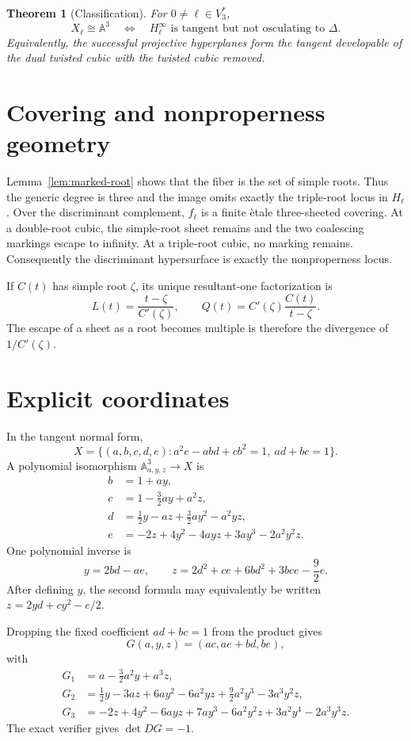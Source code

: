 \documentclass[11pt]{article}
\newcommand{\A}{\mathbb A}
\newtheorem{theorem}{Theorem}[section]
\theoremstyle{remark}
\begin{document}
\begin{theorem}[Classification]\label{thm:classification}
For $0\ne\ell\in V_3^*$,
\[
X_\ell\cong\A^3
\quad\Longleftrightarrow\quad
H_\ell^\infty\text{ is tangent but not osculating to }\Delta.
\]
Equivalently, the successful projective hyperplanes form the tangent
developable of the dual twisted cubic with the twisted cubic removed.
\end{theorem}

\section{Covering and nonproperness geometry}

Lemma~\ref{lem:marked-root} shows that the fiber is the set of simple roots.
Thus the generic degree is three and the image omits exactly the triple-root
locus in $H_\ell$. Over the discriminant complement, $f_\ell$ is a finite
\`etale three-sheeted covering. At a double-root cubic, the simple-root sheet
remains and the two coalescing markings escape to infinity. At a triple-root
cubic, no marking remains. Consequently the discriminant hypersurface is
exactly the nonproperness locus.

If $C(t)$ has simple root $\zeta$, its unique resultant-one factorization is
\[
L(t)=\frac{t-\zeta}{C'(\zeta)},
\qquad
Q(t)=C'(\zeta)\frac{C(t)}{t-\zeta}.
\]
The escape of a sheet as a root becomes multiple is therefore the divergence
of $1/C'(\zeta)$.

\section{Explicit coordinates}

In the tangent normal form,
\[
X=\{(a,b,c,d,e):a^2e-abd+cb^2=1,\ ad+bc=1\}.
\]
A polynomial isomorphism $\A^3_{a,y,z}\to X$ is
\[
\begin{aligned}
b&=1+ay,\\
c&=1-\frac32ay+a^2z,\\
d&=\frac12y-az+\frac32ay^2-a^2yz,\\
e&=-2z+4y^2-4ayz+3ay^3-2a^2y^2z.
\end{aligned}
\]
One polynomial inverse is
\[
y=2bd-ae,
\qquad
z=2d^2+ce+6bd^2+3bce-\frac92e.
\]
After defining $y$, the second formula may equivalently be written
$z=2yd+cy^2-e/2$.

Dropping the fixed coefficient $ad+bc=1$ from the product gives
\[
G(a,y,z)=(ac,ae+bd,be),
\]
with
\[
\begin{aligned}
G_1&=a-\frac32a^2y+a^3z,\\
G_2&=\frac12y-3az+6ay^2-6a^2yz+\frac92a^2y^3-3a^3y^2z,\\
G_3&=-2z+4y^2-6ayz+7ay^3-6a^2y^2z+3a^2y^4-2a^3y^3z.
\end{aligned}
\]
The exact verifier gives $\det DG=-1$.
\end{document}
